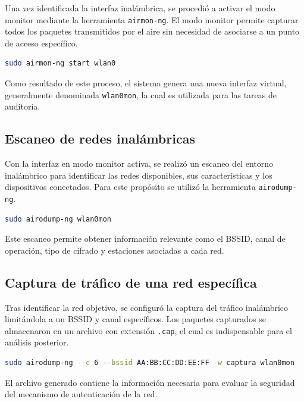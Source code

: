 Una vez identificada la interfaz inalámbrica, se procedió a activar el modo monitor mediante la herramienta \texttt{airmon-ng}. El modo monitor permite capturar todos los paquetes transmitidos por el aire sin necesidad de asociarse a un punto de acceso específico.

\begin{lstlisting}[language=bash, caption={Activación del modo monitor}]
sudo airmon-ng start wlan0
\end{lstlisting}

Como resultado de este proceso, el sistema genera una nueva interfaz virtual, generalmente denominada \texttt{wlan0mon}, la cual es utilizada para las tareas de auditoría.

\subsection{Escaneo de redes inalámbricas}

Con la interfaz en modo monitor activa, se realizó un escaneo del entorno inalámbrico para identificar las redes disponibles, sus características y los dispositivos conectados. Para este propósito se utilizó la herramienta \texttt{airodump-ng}.

\begin{lstlisting}[language=bash, caption={Escaneo de redes WiFi}]
sudo airodump-ng wlan0mon
\end{lstlisting}

Este escaneo permite obtener información relevante como el BSSID, canal de operación, tipo de cifrado y estaciones asociadas a cada red.

\subsection{Captura de tráfico de una red específica}

Tras identificar la red objetivo, se configuró la captura del tráfico inalámbrico limitándola a un BSSID y canal específicos. Los paquetes capturados se almacenaron en un archivo con extensión \texttt{.cap}, el cual es indispensable para el análisis posterior.

\begin{lstlisting}[language=bash, caption={Captura de tráfico de una red específica}]
sudo airodump-ng --c 6 --bssid AA:BB:CC:DD:EE:FF -w captura wlan0mon
\end{lstlisting}

El archivo generado contiene la información necesaria para evaluar la seguridad del mecanismo de autenticación de la red.

